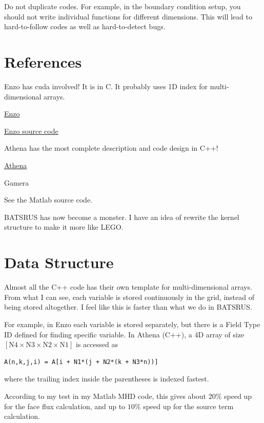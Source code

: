 \documentclass[11pt]{book} %
\begin{document}
\section{}

Do not duplicate codes. For example, in the boundary condition setup, you should not write individual functions for different dimensions. This will lead to hard-to-follow codes as well as hard-to-detect bugs.

\section{References}

Enzo has cuda involved! It is in C. It probably uses 1D index for multi-dimensional arrays.

\href{http://enzo-project.org}{Enzo}

\href{https://bitbucket.org/enzo/enzo-dev}{Enzo source code}

Athena has the most complete description and code design in C++!

\href{https://princetonuniversity.github.io/athena/}{Athena}

Gamera

See the Matlab source code.

BATSRUS has now become a monster. I have an idea of rewrite the kernel structure to make it more like LEGO.

\section{Data Structure}

Almost all the C++ code has their own template for multi-dimensional arrays. From what I can see, each variable is stored continuously in the grid, instead of being stored altogether. I feel like this is faster than what we do in BATSRUS.

For example, in Enzo each variable is stored separately, but there is a Field Type ID defined for finding specific variable. In Athena (C++), a 4D array of size $[\text{N4}\times \text{N3}\times \text{N2}\times \text{N1}]$ is accessed as
\begin{verbatim}
A(n,k,j,i) = A[i + N1*(j + N2*(k + N3*n))]
\end{verbatim}
where the trailing index inside the parentheses is indexed fastest.

According to my test in my Matlab MHD code, this gives about $20\%$ speed up for the face flux calculation, and up to $10\%$ speed up for the source term calculation.
\end{document}

